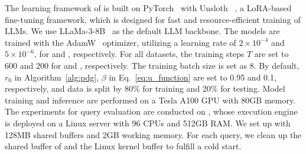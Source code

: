 The learning framework of \LLMQO is built on PyTorch~\cite{pytorch} with Unsloth~\cite{unsloth}
, a LoRA-based fine-tuning framework, which is designed for fast and resource-efficient training of LLMs. We use LLaMa-3-8B~\cite{DBLP:journals/corr/abs-2407-21783} as the default LLM backbone. 
%
The models are trained with the AdamW~\cite{DBLP:conf/iclr/LoshchilovH19} optimizer, utilizing a learning rate of $2 \times 10^{-4}$ and $5 \times 10^{-6}$, for \QIT and \QDPO, respectively. For all datasets, the training steps $T$ are set to 600 and 200 for \QIT and \QDPO, respectively. The training batch size is set as 8.
By default, $r_0$ in Algorithm~\ref{alg:pdg}, $\beta$ in Eq.~\eqref{eq:u_function} are set to 0.95 and 0.1, respectively, and data is split by 80\% for training and 20\% for testing. 
Model training and inference are performed on a Tesla A100 GPU with 80GB memory. 
%
The experiments for query evaluation are conducted on , 
whose execution engine is deployed on a Linux server with 96 CPUs and 512GB RAM. We set up \Postgres with 128MB shared buffers and 2GB working memory. 
For each query, we clean up the shared buffer of \Postgres and the Linux kernel buffer to fulfill a cold start. 

